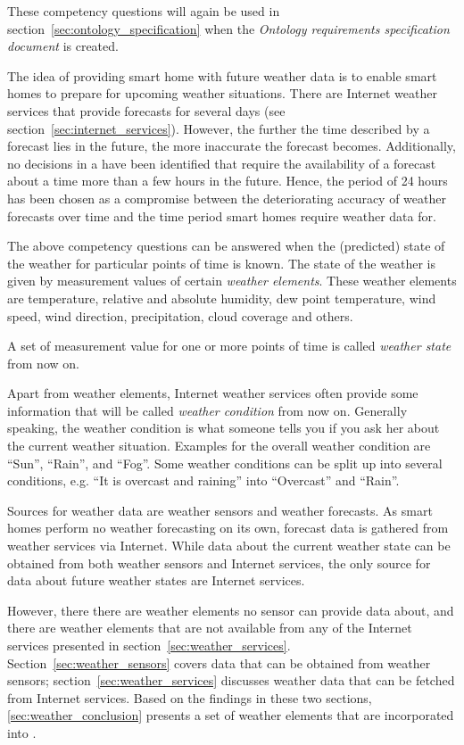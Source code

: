 These competency questions will again be used in section~\ref{sec:ontology_specification} when the \emph{Ontology requirements specification document} is created.

The idea of providing smart home with future weather data is to enable smart homes to prepare for upcoming weather situations. There are Internet weather services that provide forecasts for several days (see section~\ref{sec:internet_services}). However, the further the time described by a forecast lies in the future, the more inaccurate the forecast becomes\cite{forecast_error1,forecast_error2}. Additionally, no decisions in a \smarthome have been identified that require the availability of a forecast about a time more than a few hours in the future. Hence, the period of 24 hours has been chosen as a compromise between the deteriorating accuracy of weather forecasts over time and the time period smart homes require weather data for.

The above competency questions can be answered when the (predicted) state of the weather for particular points of time is known. The state of the weather is given by measurement values of certain \emph{weather elements}. These weather elements are temperature, relative and absolute humidity, dew point temperature, wind speed, wind direction, precipitation, cloud coverage and others.\cite{GlossaryOfMeteorology}

A set of measurement value for one or more points of time is called \emph{weather state} from now on.

Apart from weather elements, Internet weather services often provide some information that will be called \emph{weather condition} from now on. Generally speaking, the weather condition is what someone tells you if you ask her about the current weather situation. Examples for the overall weather condition are ``Sun'', ``Rain'', and ``Fog''. Some weather conditions can be split up into several conditions, e.g. ``It is overcast and raining'' into ``Overcast'' and ``Rain''.

Sources for weather data are weather sensors and weather forecasts. As smart homes perform no weather forecasting on its own, forecast data is gathered from weather services via Internet. While data about the current weather state can be obtained from both weather sensors and Internet services, the only source for data about future weather states are Internet services.

However, there there are weather elements no sensor can provide data about, and there are weather elements that are not available from any of the Internet services presented in section~\ref{sec:weather_services}. Section~\ref{sec:weather_sensors} covers data that can be obtained from weather sensors; section~\ref{sec:weather_services} discusses weather data that can be fetched from Internet services. Based on the findings in these two sections, \ref{sec:weather_conclusion} presents a set of weather elements that are incorporated into \smarthomeweather.

